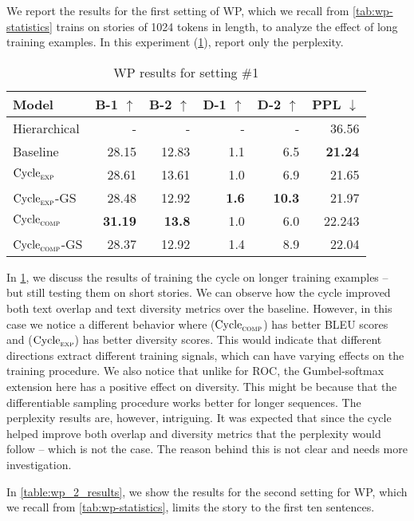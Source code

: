 We report the results for the first setting of WP, which we recall from \cref{tab:wp-statistics} trains on stories of 1024 tokens in length, to analyze the effect of long training examples. In this experiment (\cref{table:wp_1_results}), \citep{fan2018hierarchical} report only the perplexity.

\begin{table}[ht]
\centering
\begin{tabular}{l|rr|rr|r}
Model & B-1 $\uparrow$ & B-2 $\uparrow$ & D-1 $\uparrow$ & D-2 $\uparrow$ & PPL $\downarrow$  \\ \hline
Hierarchical & - & - & - & - & 36.56 \\ \hline
Baseline & 28.15 & 12.83 & 1.1 & 6.5  & \textbf{21.24} \\
$\text{Cycle}_{\textsc{exp}}$ & 28.61 & 13.61 & 1.0 & 6.9 & 21.65 \\
$\text{Cycle}_{\textsc{exp}}$-GS & 28.48 & 12.92 & \textbf{1.6} & \textbf{10.3} & 21.97 \\
$\text{Cycle}_{\textsc{comp}}$ & \textbf{31.19} & \textbf{13.8} & 1.0 & 6.0 & 22.243 \\
$\text{Cycle}_{\textsc{comp}}$-GS & 28.37 & 12.92 & 1.4 & 8.9 & 22.04
\end{tabular}
\caption{WP results for setting \#1}
\label{table:wp_1_results}
\end{table}

In \cref{table:wp_1_results}, we discuss the results of training the cycle on longer training examples -- but still testing them on short stories. We can observe how the cycle improved both text overlap and text diversity metrics over the baseline. However, in this case we notice a different behavior where ($\text{Cycle}_{\textsc{comp}}$) has better BLEU scores and ($\text{Cycle}_{\textsc{exp}}$) has better diversity scores. This would indicate that different directions extract different training signals, which can have varying effects on the training procedure. We also notice that unlike for ROC, the Gumbel-softmax extension here has a positive effect on diversity. This might be because that the differentiable sampling procedure works better for longer sequences. The perplexity results are, however, intriguing. It was expected that since the cycle helped improve both overlap and diversity metrics that the perplexity would follow -- which is not the case. The reason behind this is not clear and needs more investigation.

In \cref{table:wp_2_results}, we show the results for the second setting for WP, which we recall from \cref{tab:wp-statistics}, limits the story to the first ten sentences.

